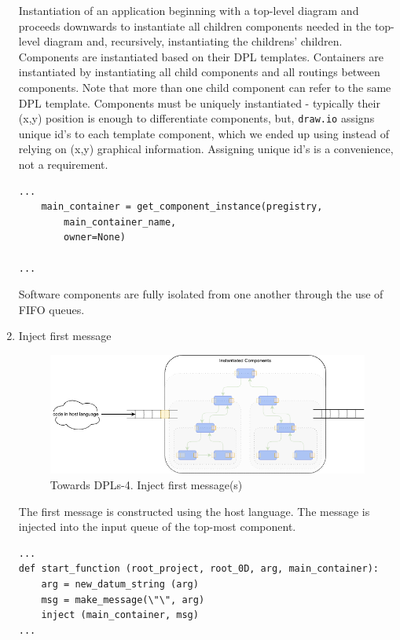 \documentclass[10pt]{acmart}
\begin{document}
\begin{enumerate}
  Instantiation\cite{run} of an application beginning with a top-level diagram
and proceeds downwards to instantiate all children components needed in
the top-level diagram and, recursively, instantiating the childrens'
children. Components are instantiated based on their DPL templates.
Containers are instantiated by instantiating all child components and
all routings between components. Note that more than one child component
can refer to the same DPL template. Components must be uniquely
instantiated - typically their (x,y) position is enough to differentiate
components, but, \texttt{draw.io} assigns unique
id's to each template component, which we ended up using instead of
relying on (x,y) graphical information. Assigning unique id's is a
convenience, not a requirement.


\begin{verbatim}
...
    main_container = get_component_instance(pregistry,
        main_container_name,
        owner=None)

...
\end{verbatim}

Software components are fully isolated from one another through the use
of FIFO queues.

\item Inject first message
  \begin{figure}[h]
    \centering
    \includegraphics[width=0.8\linewidth]{./media/image5.png}
    \caption{Towards DPLs-4. Inject first message(s)}
    \label{fig:inject_first_message}
  \end{figure}

The first message is constructed using the host language. The message is
injected\cite{main} into the input queue of the top-most component.

\begin{verbatim}
...
def start_function (root_project, root_0D, arg, main_container):
    arg = new_datum_string (arg)
    msg = make_message(\"\", arg)
    inject (main_container, msg)
...
\end{verbatim}
  

\end{enumerate}
\end{document}
